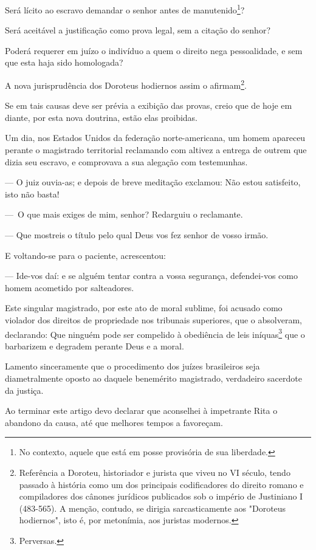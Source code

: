 Será lícito ao escravo demandar o senhor antes de manutenido\footnote{
  No contexto, aquele que está em posse provisória de sua liberdade.}?

Será aceitável a justificação como prova legal, sem a citação do senhor?

Poderá requerer em juízo o indivíduo a quem o direito nega pessoalidade,
e sem que esta haja sido homologada?

A nova jurisprudência dos Doroteus hodiernos assim o afirmam\footnote{
  Referência a Doroteu, historiador e jurista que viveu no VI século,
  tendo passado à história como um dos principais codificadores do
  direito romano e compiladores dos cânones jurídicos publicados sob o
  império de Justiniano I (483-565). A menção, contudo, se dirigia
  sarcasticamente aos "Doroteus hodiernos", isto é, por metonímia, aos
  juristas modernos.}.

Se em tais causas deve ser prévia a exibição das provas, creio que de
hoje em diante, por esta nova doutrina, estão elas proibidas.

Um dia, nos Estados Unidos da federação norte-americana, um homem
apareceu perante o magistrado territorial reclamando com altivez a
entrega de outrem que dizia seu escravo, e comprovava a sua alegação com
testemunhas.

--- O juiz ouvia-as; e depois de breve meditação exclamou: Não estou
satisfeito, isto não basta!

---~O que mais exiges de mim, senhor? Redarguiu o reclamante.

--- Que mostreis o título pelo qual Deus vos fez senhor de vosso irmão.

E voltando-se para o paciente, acrescentou:

--- Ide-vos daí: e se alguém tentar contra a vossa segurança,
defendei-vos como homem acometido por salteadores.

Este singular magistrado, por este ato de moral sublime, foi acusado
como violador dos direitos de propriedade nos tribunais superiores, que
o absolveram, declarando: Que ninguém pode ser compelido à obediência de
leis iníquas\footnote{Perversas.} que o barbarizem e degradem perante
Deus e a moral.

Lamento sinceramente que o procedimento dos juízes brasileiros seja
diametralmente oposto ao daquele benemérito magistrado, verdadeiro
sacerdote da justiça.

Ao terminar este artigo devo declarar que aconselhei à impetrante Rita o
abandono da causa, até que melhores tempos a favoreçam.

